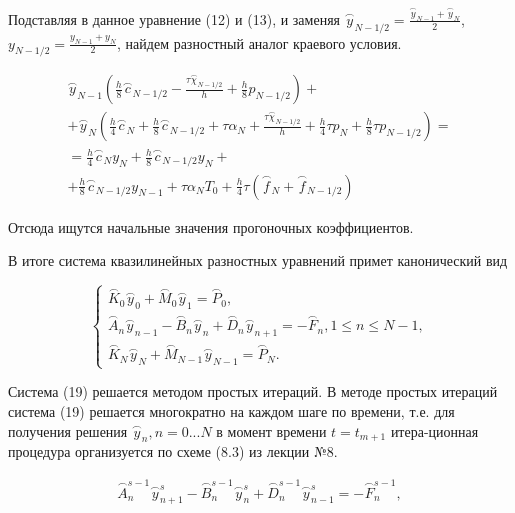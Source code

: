 \documentclass[a4paper,14pt]{article}
\begin{document}
Подставляя  в  данное  уравнение (12) и (13), и заменяя
$\stackrel{\frown}{y}_{N-1/2} = \frac{ \stackrel{\frown}{y}_{N-1} + \stackrel{\frown}{y}_N }{2}$, 
$y_{N-1/2} = \frac{y_{N-1} + y_N}{2}$, найдем разностный аналог краевого условия.

\begin{eqnarray}
	\stackrel{\frown}{y}_{N-1} \left( \frac{h}{8} \stackrel{\frown}{c}_{N-1/2} - \frac{\tau \stackrel{\frown}{\chi}_{N-1/2} }{h} + \frac{h}{8} p_{N-1/2} \right) + \nonumber \\
	+ \stackrel{\frown}{y}_N \left( \frac{h}{4} \stackrel{\frown}{c}_N + \frac{h}{8} \stackrel{\frown}{c}_{N-1/2} + \tau \alpha_N + \frac{\tau \stackrel{\frown}{\chi}_{N-1/2}}{h} + \frac{h}{4} \tau p_N + \frac{h}{8} \tau p_{N-1/2} \right) = \nonumber \\
	= \frac{h}{4} \stackrel{\frown}{c}_N y_N + \frac{h}{8} \stackrel{\frown}{c}_{N-1/2} y_N + \nonumber \\
	+ \frac{h}{8} \stackrel{\frown}{c}_{N-1/2} y_{N-1} + \tau \alpha_N T_0 + \frac{h}{4} \tau \left( \stackrel{\frown}{f}_N + \stackrel{\frown}{f}_{N-1/2} \right)
\end{eqnarray}

Отсюда ищутся начальные значения прогоночных коэффициентов.

В итоге система квазилинейных разностных уравнений примет канонический вид

\begin{equation}
	\begin{cases}
		\stackrel{\frown}{K}_0 \stackrel{\frown}{y}_0 + \stackrel{\frown}{M}_0 \stackrel{\frown}{y}_1 = \stackrel{\frown}{P}_0, \\
		\stackrel{\frown}{A}_n \stackrel{\frown}{y}_{n-1} - \stackrel{\frown}{B}_n \stackrel{\frown}{y}_n + \stackrel{\frown}{D}_n \stackrel{\frown}{y}_{n+1} = - \stackrel{\frown}{F}_n, 1 \leq n \leq N-1, \\
		\stackrel{\frown}{K}_N \stackrel{\frown}{y}_N + \stackrel{\frown}{M}_{N-1} \stackrel{\frown}{y}_{N-1} = \stackrel{\frown}{P}_N.
	\end{cases}
\end{equation}

Система (19) решается методом простых итераций. В методе простых итераций система (19)
решается многократно на каждом шаге по времени, т.е. для получения решения 
$\stackrel{\frown}{y}_n, n = 0...N$ в момент времени $t = t_{m+1}$ итера-ционная процедура организуется по схеме (8.3) из лекции №8.

\begin{eqnarray}
	\stackrel{\frown}{A}_n^{s-1} \stackrel{\frown}{y}_{n+1}^s - \stackrel{\frown}{B}_n^{s-1} \stackrel{\frown}{y}_n^s + \stackrel{\frown}{D}_n^{s-1} \stackrel{\frown}{y}_{n-1}^s = - \stackrel{\frown}{F}_n^{s-1},
\end{eqnarray}
\end{document}
